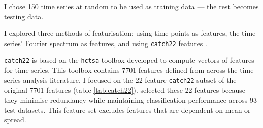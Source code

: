 
I chose 150 time series at random to be used as training data --- the rest becomes testing data.


I explored three methods of featurisation: using time points as features, the time series' Fourier spectrum as features, and using \texttt{catch22} features \parencite{lubbaCatch22CAnonicalTimeseries2019}.

\texttt{catch22} is based on the \texttt{hctsa} toolbox \parencite{fulcherHctsaComputationalFramework2017} developed to compute vectors of features for time series.
This toolbox contains 7701 features defined from across the time series analysis literature.
I focused on the 22-feature \texttt{catch22} subset of the original 7701 features (table \ref{tab:catch22}).
\textcite{lubbaCatch22CAnonicalTimeseries2019} selected these 22 features because they minimise redundancy while maintaining classification performance across 93 test datasets.
This feature set excludes features that are dependent on mean or spread.

